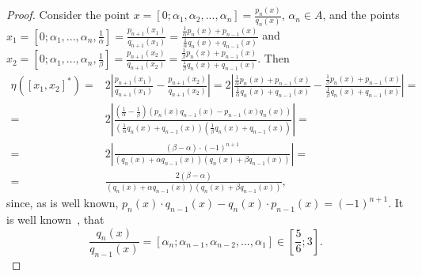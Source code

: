 \documentclass[11pt]{amsart}
\theoremstyle{plain}
\theoremstyle{remark}
\begin{document}
\begin{proof}
    Consider the point $x=[0;\alpha_1,\alpha_2,...,\alpha_n]=\frac{p_n(x)}{q_n(x)}$, $\alpha_n\in A$, and the points
 $x_1=[0;\alpha_1,...,\alpha_n,\frac{1}{\alpha}]=\frac{p_{n+1}(x_1)}{q_{n+1}(x_1)}=\frac{\frac{1}{\alpha}p_n(x)+p_{n-1}(x)}
 {\frac{1}{\alpha}q_n(x)+q_{n-1}(x)}$ and
 $x_2=[0;\alpha_1,...,\alpha_n,\frac{1}{\beta}]=\frac{p_{n+1}(x_2)}{q_{n+1}(x_2)}=\frac{\frac{1}{\beta}p_n(x)+p_{n-1}(x)}
 {\frac{1}{\beta}q_n(x)+q_{n-1}(x)}$. Then
 \begin{align*}
   \eta([x_1,x_2]^*)=&2\left|\frac{p_{n+1}(x_1)}{q_{n+1}(x_1)}-
 \frac{p_{n+1}(x_2)}{q_{n+1}(x_2)}\right|=
   2\left|\frac{\frac{1}{\alpha}p_{n}(x)+p_{n-1}(x)}{\frac{1}{\alpha}q_{n}(x)+q_{n-1}(x)}-
   \frac{\frac{1}{\beta}p_{n}(x)+p_{n-1}(x)}{\frac{1}{\beta}q_{n}(x)+q_{n-1}(x)}\right|=\\
   =&2\left|\frac{(\frac{1}{\alpha}-\frac{1}{\beta})(p_n(x)q_{n-1}(x)-p_{n-1}(x)q_{n}(x))}
   {(\frac{1}{\alpha}q_{n}(x)+q_{n-1}(x))(\frac{1}{\beta}q_{n}(x)+q_{n-1}(x))}\right|=\\
   =&2\left|\frac{(\beta-\alpha)\cdot (-1)^{n+1}}
   {(q_{n}(x)+\alpha q_{n-1}(x))(q_{n}(x)+\beta q_{n-1}(x))}\right|=\\
   =&\frac{2(\beta-\alpha)}
   {(q_{n}(x)+\alpha q_{n-1}(x))( q_{n}(x)+\beta q_{n-1}(x))},
 \end{align*}
     since, as is well known,
   $p_n(x)\cdot q_{n-1}(x)-q_n(x)\cdot p_{n-1}(x)=(-1)^{n+1}.$
  It is well known~\cite{chin,PGLR_2023}, that
   $$
   \frac{q_n(x)}{q_{n-1}(x)}=
   [\alpha_n;\alpha_{n-1},\alpha_{n-2},\ldots,\alpha_1] \in[\frac{5}{6};3].
   $$


\end{proof}
\end{document}
